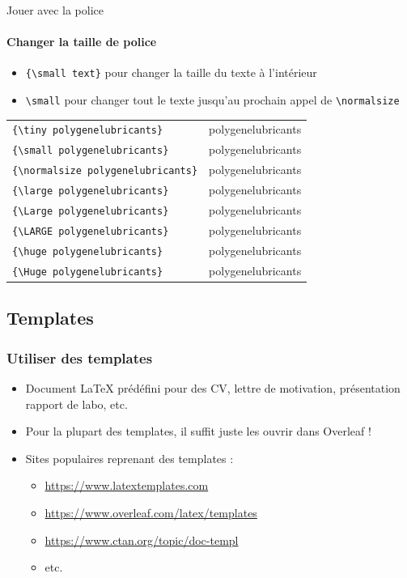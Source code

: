 \begin{frame}[fragile]{Jouer avec la police}
  \framesubtitle{Changer la taille de police}
  \begin{itemize}
      \item \lstinline|{\small text}| pour changer la taille du texte à l'intérieur
      \item \lstinline|\small| pour changer tout le texte jusqu'au prochain appel de \lstinline|\normalsize|
  \end{itemize}
  \begin{tabular}{ll}
  \lstinline|{\tiny polygenelubricants}| & {\tiny polygenelubricants} \\
  \lstinline|{\small polygenelubricants}| & {\small polygenelubricants} \\
  \lstinline|{\normalsize polygenelubricants}| & {\normalsize polygenelubricants} \\
  \lstinline|{\large polygenelubricants}| & {\large polygenelubricants} \\
  \lstinline|{\Large polygenelubricants}| & {\Large polygenelubricants} \\
  \lstinline|{\LARGE polygenelubricants}| & {\LARGE polygenelubricants} \\
  \lstinline|{\huge polygenelubricants}| & {\huge polygenelubricants} \\
  \lstinline|{\Huge polygenelubricants}| & {\Huge polygenelubricants} \\
  \end{tabular}
\end{frame}

\subsection{Templates}

\begin{frame}[fragile]
  \frametitle{Utiliser des templates}
  \begin{itemize}
    \item Document \LaTeX{} prédéfini pour des CV, lettre de motivation, présentation rapport de labo, etc.
    \item Pour la plupart des templates, il suffit juste les ouvrir dans Overleaf !
    \item Sites populaires reprenant des templates :
      \begin{itemize}
        \item \url{https://www.latextemplates.com}
        \item \url{https://www.overleaf.com/latex/templates}
        \item \url{https://www.ctan.org/topic/doc-templ}
        \item etc.
      \end{itemize}
  \end{itemize}
\end{frame}

